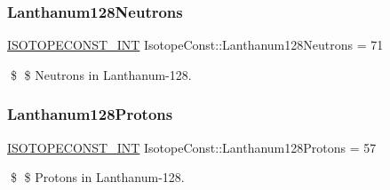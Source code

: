 \subsubsection{\texorpdfstring{Lanthanum128\+Neutrons}{Lanthanum128Neutrons}}
{\footnotesize\ttfamily \mbox{\hyperlink{group___isotope_const-_macros_ga5f18360b3e99483a35c32d789e62621c}{I\+S\+O\+T\+O\+P\+E\+C\+O\+N\+S\+T\+\_\+\+I\+NT}} Isotope\+Const\+::\+Lanthanum128\+Neutrons = 71}

\$ \$ Neutrons in Lanthanum-\/128. \mbox{\label{group___isotope_const-_lanthanum-_la128_gac9fb4a3949e07cba2e0b253094a1797a}} 
\subsubsection{\texorpdfstring{Lanthanum128\+Protons}{Lanthanum128Protons}}
{\footnotesize\ttfamily \mbox{\hyperlink{group___isotope_const-_macros_ga5f18360b3e99483a35c32d789e62621c}{I\+S\+O\+T\+O\+P\+E\+C\+O\+N\+S\+T\+\_\+\+I\+NT}} Isotope\+Const\+::\+Lanthanum128\+Protons = 57}

\$ \$ Protons in Lanthanum-\/128. 